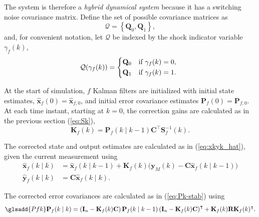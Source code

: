 The system is therefore a \textit{hybrid dynamical system} because it has a switching noise covariance matrix. Define the set of possible covariance matrices as
\begin{equation} \label{eq:init_Q_R}
	\mathcal{Q} = \left\{\mathbf{Q}_0, \mathbf{Q}_1\right\},
\end{equation}
and, for convenient notation, let $\mathcal{Q}$ be indexed by the shock indicator variable $\gamma_f(k)$,
\begin{equation} \label{eq:init_Q}
	\mathcal{Q}(\gamma_f(k)) = 
	\begin{cases*}
		\mathbf{Q}_0 & \text{if} $\gamma_f(k)=0$, \\
		\mathbf{Q}_1 & \text{if} $\gamma_f(k)=1$.
	\end{cases*}
\end{equation}

At the start of simulation, $f$ Kalman filters are initialized with initial state estimates, $\mathbf{\hat{x}}_f(0) = \mathbf{\hat{x}}_{f,0}$, and initial error covariance estimates $	\mathbf{P}_f(0) = \mathbf{P}_{f,0}$. At each time instant, starting at $k=0$, the correction gains are calculated as in the previous section (\ref{eq:Sk}),
\begin{equation} \label{eq:Kfk}
	\mathbf{K}_f(k) = \mathbf{P}_f(k \mid k-1)\mathbf{C}^\intercal \mathbf{S}_f^{-1}(k).
\end{equation}

The corrected state and output estimates are calculated as in (\ref{eq:xkyk_hat}), given the current measurement using
\begin{equation} \label{eq:xfkyfk_hat}
	\begin{aligned}
		\mathbf{\hat{x}}_f(k \mid k) &= \mathbf{\hat{x}}_f(k \mid k-1) + \mathbf{K}_f(k) \big( \mathbf{y}_M(k) - \mathbf{C} \mathbf{\hat{x}}_f(k \mid k-1) \big) \\
		\mathbf{\hat{y}}_f(k \mid k) &= \mathbf{C} \mathbf{\hat{x}}_f(k \mid k).
	\end{aligned}
\end{equation}

The corrected error covariances are calculated as in (\ref{eq:Pk-stab}) using 
\begin{equation} \label{eq:Pkf-stab} \glsadd{Pfk}
	\mathbf{P}_f(k \mid k) = \left( \mathbf{I}_n - \mathbf{K}_f(k) \mathbf{C} \right ) \mathbf{P}_f(k \mid k-1) \left( \mathbf{I}_n - \mathbf{K}_f(k) \mathbf{C} \right )^\intercal + \mathbf{K}_f(k)  \mathbf{R} \mathbf{K}_f(k)^\intercal.
\end{equation}

